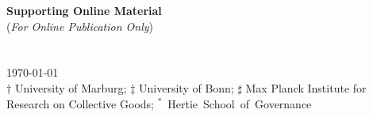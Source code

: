 \documentclass[11pt,a4paper]{article}
\begin{document}
\begin{spacing}{1.15}

\setcounter{footnote}{0}
\renewcommand{\thesection}{\Roman{section}}\setcounter{section}{0}
\renewcommand{\thesubsection}{\Roman{section}.\arabic{subsection}}\setcounter{subsection}{0}

\renewcommand{\thetable}{S.\arabic{table}} \setcounter{table}{0}
\renewcommand{\theequation}{S.\arabic{equation}} \setcounter{equation}{0}
\renewcommand{\thefigure}{S.\arabic{figure}} \setcounter{figure}{0}


\begin{center}
  \textbf{\Large{Supporting Online Material}}\\ \normalsize{(\textsl{For Online Publication Only})}\bigskip\\
  { \Large {\textbf {\thetitle}}} \bigskip\\
  { \large {\theauthor }}\medskip\\
  \today \bigskip \\
   {\footnotesize$\dag$ University of Marburg; $\ddag$ University of Bonn; $\sharp$ Max Planck Institute for Research on Collective Goods; \mbox{$^*$ Hertie School of Governance}}
\end{center}

\tableofcontents
\listoftables
\listoffigures

\end{spacing}
\end{document}
